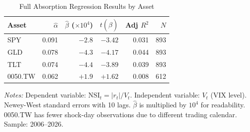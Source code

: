 \documentclass[12pt,a4paper]{article}
\begin{document}
\begin{table}[H]
\centering
\caption{Full Absorption Regression Results by Asset}
\label{tab:cross_asset_detail}
\begin{threeparttable}
\begin{tabular}{lrrrrr}
\toprule
Asset & $\hat{\alpha}$ & $\hat{\beta}$ ($\times 10^4$) & $t(\hat{\beta})$ & Adj $R^2$ & $N$ \\
\midrule
SPY     & 0.091 & $-2.8$ & $-3.42$ & 0.031 & 893 \\
GLD     & 0.078 & $-4.3$ & $-4.17$ & 0.044 & 893 \\
TLT     & 0.074 & $-4.4$ & $-3.89$ & 0.039 & 893 \\
0050.TW & 0.062 & $+1.9$ & $+1.62$ & 0.008 & 612 \\
\bottomrule
\end{tabular}
\begin{tablenotes}
\small
\item \textit{Notes:} Dependent variable: $\text{NSI}_t = |r_t| / V_t$. Independent variable: $V_t$ (VIX level). Newey-West standard errors with 10 lags. $\hat{\beta}$ is multiplied by $10^4$ for readability. 0050.TW has fewer shock-day observations due to different trading calendar. Sample: 2006--2026.
\end{tablenotes}
\end{threeparttable}
\end{table}
\end{document}
